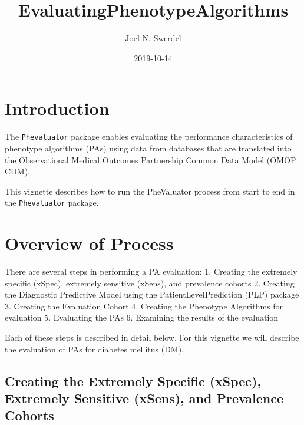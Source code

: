 \documentclass[]{article}
\title{EvaluatingPhenotypeAlgorithms}
\author{Joel N. Swerdel}
\date{2019-10-14}
\begin{document}
\maketitle

{
\setcounter{tocdepth}{3}
\tableofcontents
}
\newpage

\hypertarget{introduction}{%
\section{Introduction}\label{introduction}}

The \texttt{Phevaluator} package enables evaluating the performance
characteristics of phenotype algorithms (PAs) using data from databases
that are translated into the Observational Medical Outcomes Partnership
Common Data Model (OMOP CDM).

This vignette describes how to run the PheValuator process from start to
end in the \texttt{Phevaluator} package.

\hypertarget{overview-of-process}{%
\section{Overview of Process}\label{overview-of-process}}

There are several steps in performing a PA evaluation: 1. Creating the
extremely specific (xSpec), extremely sensitive (xSens), and prevalence
cohorts 2. Creating the Diagnostic Predictive Model using the
PatientLevelPrediction (PLP) package 3. Creating the Evaluation Cohort
4. Creating the Phenotype Algorithms for evaluation 5. Evaluating the
PAs 6. Examining the results of the evaluation

Each of these steps is described in detail below. For this vignette we
will describe the evaluation of PAs for diabetes mellitus (DM).

\hypertarget{creating-the-extremely-specific-xspec-extremely-sensitive-xsens-and-prevalence-cohorts}{%
\subsection{Creating the Extremely Specific (xSpec), Extremely Sensitive
(xSens), and Prevalence
Cohorts}\label{creating-the-extremely-specific-xspec-extremely-sensitive-xsens-and-prevalence-cohorts}}
\end{document}
